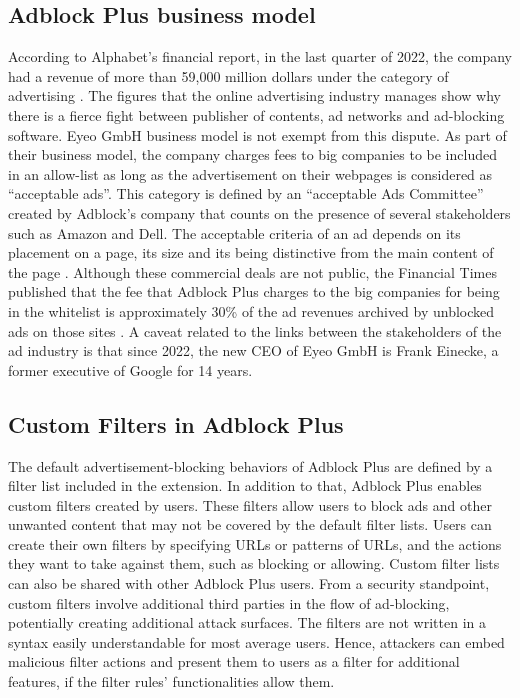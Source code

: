 \documentclass[conference]{IEEEtran}
\begin{document}
\subsection{Adblock Plus business model}
According to Alphabet's financial report, in the last quarter of 2022, the company had a revenue of more than 59,000 million dollars under the category of advertising \cite{alphabet_revenue}. The figures that the online advertising industry manages show why there is a fierce fight between publisher of contents, ad networks and ad-blocking software. Eyeo GmbH business model is not exempt from this dispute. As part of their business model, the company charges fees to big companies to be included in an allow-list as long as the advertisement on their webpages is considered as ``acceptable ads''. This category is defined by an ``acceptable Ads Committee'' created by Adblock's company that counts on the presence of several stakeholders such as Amazon and Dell. The acceptable criteria of an ad depends on its placement on a page, its size and its being distinctive from the main content of the page \cite{acceptable_ads}. Although these commercial deals are not public, the Financial Times published that the fee that Adblock Plus charges to the big companies for being in the whitelist is approximately 30\% of the ad revenues archived by unblocked ads on those sites \cite{financial_times}. 
A caveat related to the links between the stakeholders of the ad industry is that since 2022, the new CEO of Eyeo GmbH is Frank Einecke, a former executive of Google for 14 years.


\subsection{Custom Filters in Adblock Plus}
The default advertisement-blocking behaviors of Adblock Plus are defined by a filter list included in the extension. In addition to that, Adblock Plus enables custom filters created by users. These filters allow users to block ads and other unwanted content that may not be covered by the default filter lists. Users can create their own filters by specifying URLs or patterns of URLs, and the actions they want to take against them, such as blocking or allowing. Custom filter lists can also be shared with other Adblock Plus users. From a security standpoint, custom filters involve additional third parties in the flow of ad-blocking, potentially creating additional attack surfaces. The filters are not written in a syntax easily understandable for most average users. Hence, attackers can embed malicious filter actions and present them to users as a filter for additional features, if the filter rules' functionalities allow them.
\end{document}
